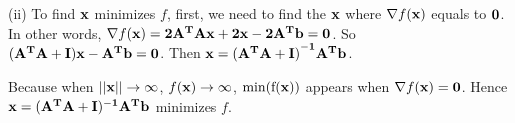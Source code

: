 \documentclass[twoside,11pt]{homework}
\begin{document}
{%

\vspace{3 mm}

\noindent (ii) To find $\bf{x}$ minimizes $f$, first, we need to find the $\bf{x}$ where $\nabla f (\bf{x})$ equals to $\bf{0}$.
In other words, $ \nabla f (\bf{x}) = \bf{2A^TA x + 2x - 2 A^Tb} = \bf{0}$.
So  $  \bf{(A^TA + I) x -  A^Tb} = \bf{0}$.
Then $\bf{ x = (A^TA + I)}^{-1} \bf{A^Tb}$. 

Because when $||\bf{x}|| \to \infty$, $ f(\bf{x}) \to \infty$,  $\rm{min} (f(\bf{x}))$ appears when $\nabla f (\bf{x}) = \bf{0}$.
Hence $\bf{ x = (A^TA + I)^{-1} A^Tb}$ minimizes $f$. 

}
\end{document}
